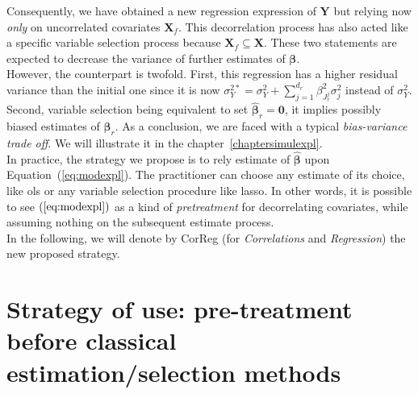 \documentclass[12pt,a4paper]{report}
\begin{document}
Consequently, we have obtained a new regression expression of $\boldsymbol{Y}$ but relying now {\it only} on uncorrelated covariates $\boldsymbol{X}_f$. This decorrelation process has also acted like a specific variable selection process because $\boldsymbol{X}_f \subseteq \boldsymbol{X}$. These two statements are expected to decrease the variance of further estimates of $\boldsymbol{\beta}$.\\

 However, the counterpart is twofold. First, this regression has a higher residual variance than the initial one since it is now $\sigma^{2*}_Y=\sigma^2_Y+\sum_{j =1}^{d_r}\beta_{J_r^j}^2\sigma^2_j$ instead of $\sigma^2_Y$. Second, variable selection being equivalent to set $\hat{\boldsymbol{\beta}}_r=\boldsymbol{0}$, it implies possibly biased estimates of $\boldsymbol{\beta}_r$. As a conclusion, we are faced with a typical {\it bias-variance trade off}. We will illustrate it in the chapter~\ref{chaptersimulexpl}.\\


In practice, the strategy we propose is to rely estimate of  $\hat{\boldsymbol{\beta}}$ upon Equation~(\ref{eq:modexpl}). The practitioner can choose any estimate of its choice, like {\sc ols} or any variable selection procedure like {\sc lasso}. In other words, it is possible to see $(\ref{eq:modexpl})$ as a kind of {\it pretreatment} for decorrelating covariates, while assuming nothing on the subsequent estimate process.\\

In the following, we will denote by {\sc CorReg} (for {\it Correlations} and {\it Regression}) the new proposed strategy.



\section{Strategy of use: pre-treatment before classical estimation/selection methods}\label{interpretation}
\end{document}

